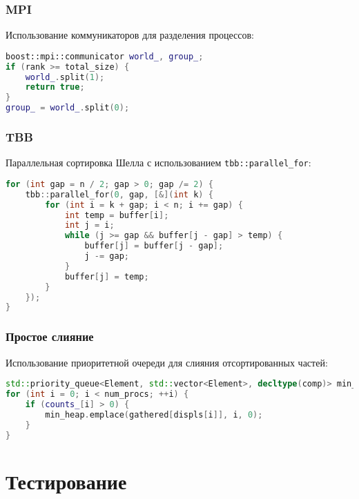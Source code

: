 \documentclass[12pt]{article}
\begin{document}
\subsubsection{MPI}
Использование коммуникаторов для разделения процессов:
\begin{lstlisting}[language=C++, caption=Фрагмент кода MPI]
boost::mpi::communicator world_, group_;
if (rank >= total_size) {
    world_.split(1);
    return true;
}
group_ = world_.split(0);
\end{lstlisting}

\subsubsection{TBB}
Параллельная сортировка Шелла с использованием \texttt{tbb::parallel\_for}:
\begin{lstlisting}[language=C++, caption=Фрагмент кода TBB]
for (int gap = n / 2; gap > 0; gap /= 2) {
    tbb::parallel_for(0, gap, [&](int k) {
        for (int i = k + gap; i < n; i += gap) {
            int temp = buffer[i];
            int j = i;
            while (j >= gap && buffer[j - gap] > temp) {
                buffer[j] = buffer[j - gap];
                j -= gap;
            }
            buffer[j] = temp;
        }
    });
}
\end{lstlisting}

\subsubsection{Простое слияние}
Использование приоритетной очереди для слияния отсортированных частей:
\begin{lstlisting}[language=C++, caption=Фрагмент кода простого слияния]
std::priority_queue<Element, std::vector<Element>, decltype(comp)> min_heap(comp);
for (int i = 0; i < num_procs; ++i) {
    if (counts_[i] > 0) {
        min_heap.emplace(gathered[displs[i]], i, 0);
    }
}
\end{lstlisting}

\section{Тестирование}
\end{document}
